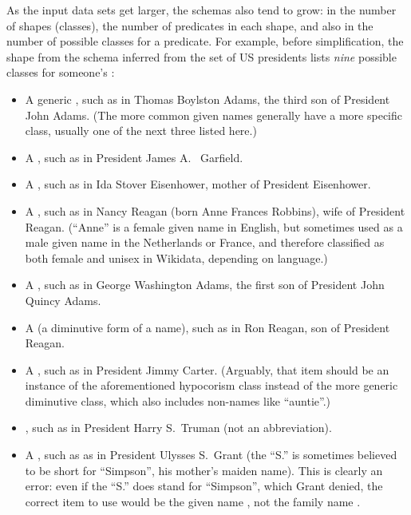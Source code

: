 As the input data sets get larger,
the schemas also tend to grow:
in the number of shapes (classes),
the number of predicates in each shape,
and also in the number of possible classes for a predicate.
For example, before simplification,
the  shape from the schema inferred from the set of US presidents
lists \emph{nine} possible classes for someone’s :
\begin{itemize}
\item A generic ,
  such as  in Thomas Boylston Adams, the third son of President John Adams.
  (The more common given names generally have a more specific class,
  usually one of the next three listed here.)
\item A ,
  such as  in President James A.~ Garfield.
\item A ,
  such as  in Ida Stover Eisenhower, mother of President Eisenhower.
\item A ,
  such as  in Nancy Reagan (born Anne Frances Robbins), wife of President Reagan.
  (“Anne” is a female given name in English,
  but sometimes used as a male given name in the Netherlands or France,
  and therefore classified as both female and unisex in Wikidata, depending on language.)
\item A ,
  such as  in George Washington Adams, the first son of President John Quincy Adams.
\item A  (a diminutive form of a name),
  such as  in Ron Reagan, son of President Reagan.
\item A ,
  such as  in President Jimmy Carter.
  (Arguably, that item should be an instance of the aforementioned hypocorism class
  instead of the more generic diminutive class, which also includes non-names like “auntie”.)
\item {},
  such as  in President Harry S.~Truman (not an abbreviation).
\item A ,
  such as  as in President Ulysses S.~Grant
  (the “S.” is sometimes believed to be short for “Simpson”, his mother’s maiden name).
  This is clearly an error: even if the “S.” does stand for “Simpson”, which Grant denied,
  the correct item to use would be the given name , not the family name .
\end{itemize}

